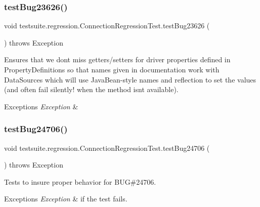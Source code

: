 \subsubsection{\texorpdfstring{test\+Bug23626()}{testBug23626()}}
{\footnotesize\ttfamily void testsuite.\+regression.\+Connection\+Regression\+Test.\+test\+Bug23626 (\begin{DoxyParamCaption}{ }\end{DoxyParamCaption}) throws Exception}

Ensures that we don\textquotesingle{}t miss getters/setters for driver properties defined in Property\+Definitions so that names given in documentation work with Data\+Sources which will use Java\+Bean-\/style names and reflection to set the values (and often fail silently! when the method isn\textquotesingle{}t available).


\begin{DoxyExceptions}{Exceptions}
{\em Exception} & \\
\hline
\end{DoxyExceptions}
\mbox{\label{classtestsuite_1_1regression_1_1_connection_regression_test_a8b623f119364af8388c15700cc8751be}} 
\subsubsection{\texorpdfstring{test\+Bug24706()}{testBug24706()}}
{\footnotesize\ttfamily void testsuite.\+regression.\+Connection\+Regression\+Test.\+test\+Bug24706 (\begin{DoxyParamCaption}{ }\end{DoxyParamCaption}) throws Exception}

Tests to insure proper behavior for B\+UG\#24706.


\begin{DoxyExceptions}{Exceptions}
{\em Exception} & if the test fails. \\
\hline
\end{DoxyExceptions}
\mbox{\label{classtestsuite_1_1regression_1_1_connection_regression_test_adbc6d893aaac816110cf40953338eead}} 

